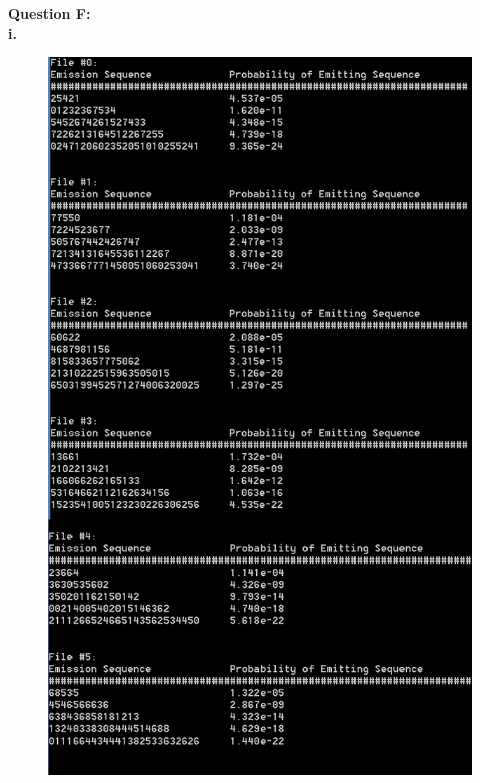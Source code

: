 \documentclass[12 pt]{article}
\begin{document}
	\noindent\textbf{Question F:} \\
	\noindent\textbf{i.}
	\begin{figure}[H]
		\includegraphics[width=13cm]{2Fi}
	\end{figure} 
	
\end{document}
